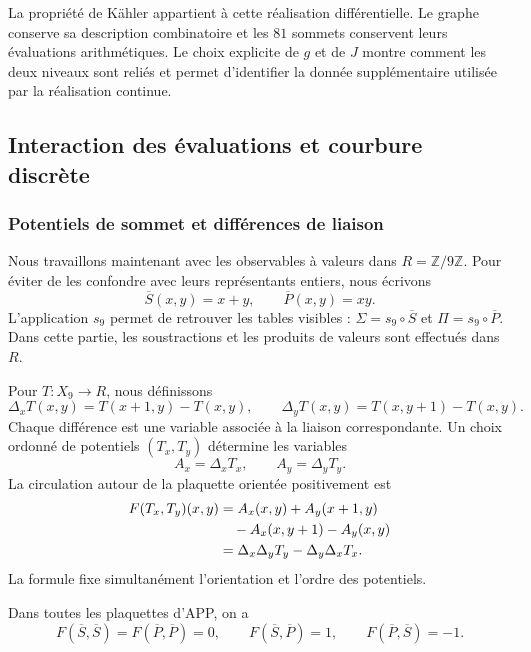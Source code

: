 La propriété de Kähler appartient à cette réalisation différentielle. Le graphe conserve sa description combinatoire et les $81$ sommets conservent leurs évaluations arithmétiques. Le choix explicite de $g$ et de $J$ montre comment les deux niveaux sont reliés et permet d'identifier la donnée supplémentaire utilisée par la réalisation continue.

\subsection{Interaction des évaluations et courbure discrète}
\label{geo:curvatura}

\subsubsection{Potentiels de sommet et différences de liaison}

Nous travaillons maintenant avec les observables à valeurs dans $R=\mathbb Z/9\mathbb Z$. Pour éviter de les confondre avec leurs représentants entiers, nous écrivons
\[
 \overline S(x,y)=x+y,\qquad \overline P(x,y)=xy.
\]
L'application $s_9$ permet de retrouver les tables visibles : $\Sigma=s_9\circ\overline S$ et $\Pi=s_9\circ\overline P$. Dans cette partie, les soustractions et les produits de valeurs sont effectués dans $R$.

Pour $T:X_9\to R$, nous définissons
\[
 \Delta_xT(x,y)=T(x+1,y)-T(x,y),\qquad
 \Delta_yT(x,y)=T(x,y+1)-T(x,y).
\]
Chaque différence est une variable associée à la liaison correspondante. Un choix ordonné de potentiels $(T_x,T_y)$ détermine les variables
\[
 A_x=\Delta_xT_x,\qquad A_y=\Delta_yT_y.
\]
La circulation autour de la plaquette orientée positivement est
\begin{align}
 F(T_x,T_y)(x,y)
 &=A_x(x,y)+A_y(x+1,y)\notag\\
 &\quad-A_x(x,y+1)-A_y(x,y)\notag\\
 &=\Delta_x\Delta_yT_y-\Delta_y\Delta_xT_x.
 \label{geo:eq-curvatura}
\end{align}
La formule fixe simultanément l'orientation et l'ordre des potentiels.

\begin{proposicion}
\label{geo:prop-curvatura}
Dans toutes les plaquettes d'APP, on a
\[
 F(\overline S,\overline S)=F(\overline P,\overline P)=0,
 \qquad
 F(\overline S,\overline P)=1,
 \qquad F(\overline P,\overline S)=-1.
\]
\end{proposicion}

